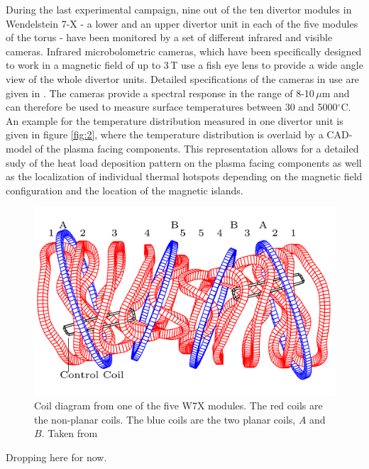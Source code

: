 During the last experimental campaign, nine out of the ten divertor modules in Wendelstein 7-X - a lower and an upper divertor unit in each of the five modules of the torus - have been monitored by a set of different infrared and visible cameras. Infrared microbolometric cameras, which have been specifically designed to work in a magnetic field of up to 3\,T use a fish eye lens to provide a wide angle view of the whole divertor units. Detailed specifications of the cameras in use are given in \cite{Jakubowski2018}. The cameras provide a spectral response in the range of 8-10\,$\mu$m and can therefore be used to measure surface temperatures between 30 and 5000$^\circ$C. An example for the temperature distribution measured in one divertor unit is given in figure \ref{fig:2}, where the temperature distribution is overlaid by a CAD-model of the plasma facing components. This representation allows for a detailed sudy of the heat load deposition pattern on the plasma facing components \cite{Niemann2020} as well as the localization of individual thermal hotspots depending on the magnetic field configuration and the location of the magnetic islands.


\begin{figure}[!htb]
    \centering
    \includegraphics[scale = 0.7]{images/magnetic-coils.png}
    \caption{Coil diagram from one of the five W7X modules. The red coils are the non-planar coils. The blue coils are the two planar coils, $A$ and $B$. Taken from \cites{Böckenhoff_2018}} \label{fig:3}
\end{figure}

Dropping here for now.

